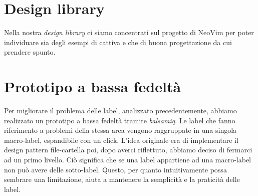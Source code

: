 \documentclass[12pt]{article} %
\begin{document}
\section{Design library}
Nella nostra \emph{design library} ci siamo concentrati sul progetto di NeoVim per poter individuare sia degli esempi di cattiva e che di buona progettazione da cui prendere spunto.\\

\section{Prototipo a bassa fedeltà}
Per migliorare il problema delle label, analizzato precedentemente, abbiamo realizzato un prototipo a bassa fedeltà tramite \emph{balsamiq}.
Le label che fanno riferimento a problemi della stessa area vengono raggruppate in una singola macro-label, espandibile con un click. L'idea originale era di implementare il design pattern file-cartella poi, dopo averci riflettuto, abbiamo deciso di fermarci ad un primo livello. Ciò significa che se una label appartiene ad una macro-label non può avere delle sotto-label.
Questo, per quanto intuitivamente possa sembrare una limitazione, aiuta a mantenere la semplicità e la praticità delle label.

\end{document}
